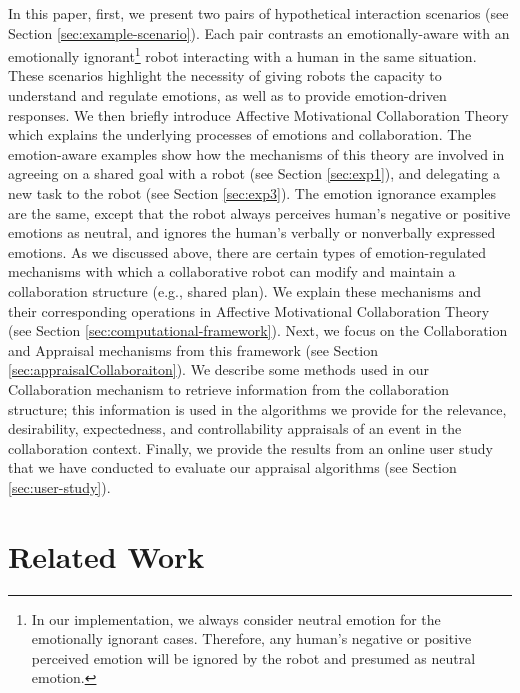 In this paper, first, we present two pairs of hypothetical interaction
scenarios (see Section \ref{sec:example-scenario}). Each pair contrasts an
emotionally-aware with an emotionally ignorant\footnote{In our implementation,
we always consider neutral emotion for the emotionally ignorant cases.
Therefore, any human's negative or positive perceived emotion will be ignored by
the robot and presumed as neutral emotion.} robot interacting with a human in
the same situation. These scenarios highlight the necessity of giving robots the
capacity to understand and regulate emotions, as well as to provide
emotion-driven responses. We then briefly introduce Affective Motivational
Collaboration Theory which explains the underlying processes of emotions and
collaboration. The emotion-aware examples show how the mechanisms of this theory
are involved in agreeing on a shared goal with a robot (see Section
\ref{sec:exp1}), and delegating a new task to the robot (see Section
\ref{sec:exp3}). The emotion ignorance examples are the same, except that the
robot always perceives human's negative or positive emotions as neutral, and
ignores the human's verbally or nonverbally expressed emotions. As we discussed
above, there are certain types of emotion-regulated mechanisms with which a
collaborative robot can modify and maintain a collaboration structure (e.g.,
shared plan). We explain these mechanisms and their corresponding operations in
Affective Motivational Collaboration Theory (see Section
\ref{sec:computational-framework}). Next, we focus on the Collaboration and
Appraisal mechanisms from this framework (see Section
\ref{sec:appraisalCollaboraiton}). We describe some methods used in our
Collaboration mechanism to retrieve information from the collaboration
structure; this information is used in the algorithms we provide for the
relevance, desirability, expectedness, and controllability appraisals of an
event in the collaboration context. Finally, we provide the results from an
online user study that we have conducted to evaluate our appraisal algorithms
(see Section \ref{sec:user-study}).

\section{Related Work}
\label{sec:related-work}

